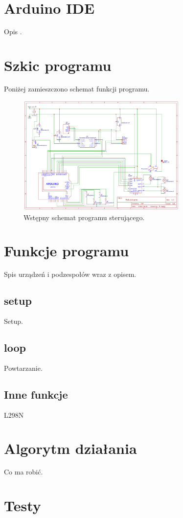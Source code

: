 \documentclass[../main/main.tex]{subfiles}
\begin{document}
\section{Arduino IDE}
Opis\cite{elo} .

\section{Szkic programu}

Poniżej zamieszczono schemat funkcji programu.

\begin{figure}[h]
\centering
\includegraphics[width=0.75\textwidth]{../obrazy/test.png}
\caption{Wstępny schemat programu sterującego.}
\label{program}
\end{figure}

\section{Funkcje programu}
Spis urządzeń i podzespołów wraz z opisem\cite{shu}.

\subsection{setup}
Setup.

\subsection{loop}
Powtarzanie.

\subsection{Inne funkcje}
L298N

\section{Algorytm działania}
Co ma robić.

\section{Testy}
\end{document}
